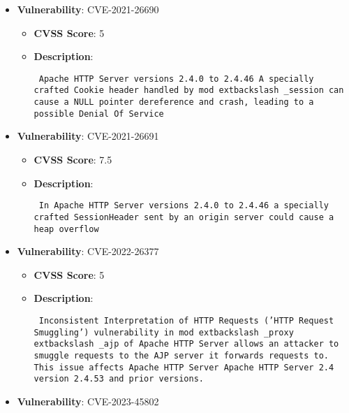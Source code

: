 \documentclass{article}
\begin{document}
\begin{itemize}
        \item \textbf{Vulnerability}: CVE-2021-26690
        \begin{itemize}
            \item \textbf{CVSS Score}:  5 
            \item \textbf{Description}: \parbox{\linewidth}{\texttt{ Apache HTTP Server versions 2.4.0 to 2.4.46 A specially crafted Cookie header handled by mod	extbackslash _session can cause a NULL pointer dereference and crash, leading to a possible Denial Of Service }}
        \end{itemize}
    
        \item \textbf{Vulnerability}: CVE-2021-26691
        \begin{itemize}
            \item \textbf{CVSS Score}:  7.5 
            \item \textbf{Description}: \parbox{\linewidth}{\texttt{ In Apache HTTP Server versions 2.4.0 to 2.4.46 a specially crafted SessionHeader sent by an origin server could cause a heap overflow }}
        \end{itemize}
    
        \item \textbf{Vulnerability}: CVE-2022-26377
        \begin{itemize}
            \item \textbf{CVSS Score}:  5 
            \item \textbf{Description}: \parbox{\linewidth}{\texttt{ Inconsistent Interpretation of HTTP Requests ('HTTP Request Smuggling') vulnerability in mod	extbackslash _proxy	extbackslash _ajp of Apache HTTP Server allows an attacker to smuggle requests to the AJP server it forwards requests to. This issue affects Apache HTTP Server Apache HTTP Server 2.4 version 2.4.53 and prior versions. }}
        \end{itemize}
    
        \item \textbf{Vulnerability}: CVE-2023-45802
\end{itemize}
\end{document}
